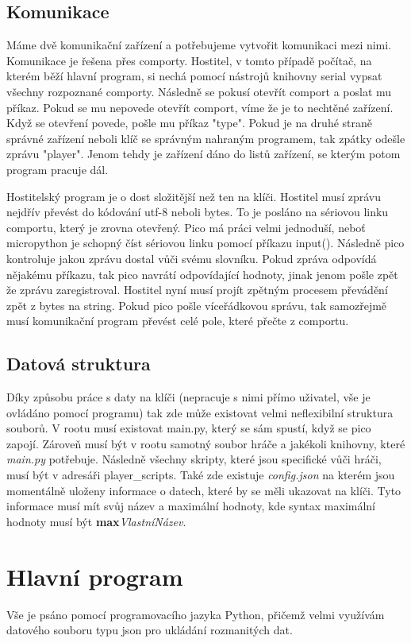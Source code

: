 \documentclass[12pt,a4paper]{article}
\begin{document}
\subsection{Komunikace}
Máme dvě komunikační zařízení a potřebujeme vytvořit komunikaci mezi nimi. Komunikace je řešena přes comporty. Hostitel, v tomto případě počítač, na kterém běží hlavní program, si nechá pomocí nástrojů knihovny serial vypsat všechny rozpoznané comporty. Následně se pokusí otevřít comport a poslat mu příkaz. Pokud se mu nepovede otevřít comport, víme že je to nechtěné zařízení. Když se otevření povede, pošle mu příkaz "type". Pokud je na druhé straně správné zařízení neboli klíč se správným nahraným programem, tak zpátky odešle zprávu "player". Jenom tehdy je zařízení dáno do listů zařízení, se kterým potom program pracuje dál.

Hostitelský program je o dost složitější než ten na klíči. Hostitel musí zprávu nejdřív převést do kódování utf-8 neboli bytes. To je posláno na sériovou linku comportu, který je zrovna otevřený. Pico má práci velmi jednoduší, neboť micropython je schopný číst sériovou linku pomocí příkazu input(). Následně pico kontroluje jakou zprávu dostal vůči svému slovníku. Pokud zpráva odpovídá nějakému příkazu, tak pico navrátí odpovídající hodnoty, jinak jenom pošle zpět že zprávu zaregistroval. Hostitel nyní musí projít zpětným procesem převádění zpět z bytes na string. Pokud pico pošle víceřádkovou správu, tak samozřejmě musí komunikační program převést celé pole, které přečte z comportu. 

\subsection{Datová struktura}
Díky způsobu práce s daty na klíči (nepracuje s nimi přímo uživatel, vše je ovládáno pomocí programu) tak zde může existovat velmi neflexibilní struktura souborů. V rootu musí existovat main.py, který se sám spustí, když se pico zapojí. Zároveň musí být v rootu samotný soubor hráče a jakékoli knihovny, které \textit{main.py} potřebuje. Následně všechny skripty, které jsou specifické vůči hráči, musí být v adresáři player\_scripts. Také zde existuje \textit{config.json} na kterém jsou momentálně uloženy informace o datech, které by se měli ukazovat na klíči. Tyto informace musí mít svůj název a maximální hodnoty, kde syntax maximální hodnoty musí být \textbf{max}\textit{VlastníNázev}.


\section{Hlavní program}
Vše je psáno pomocí programovacího jazyka Python, přičemž velmi využívám datového souboru typu json pro ukládání rozmanitých dat.
\end{document}
